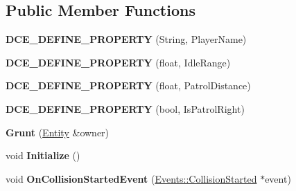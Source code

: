 \subsection*{Public Member Functions}
\begin{DoxyCompactItemize}
\item 
\hypertarget{classDCEngine_1_1Components_1_1Grunt_a0d5f3e19e82ab68d62b8fef4d9335e28}{{\bfseries D\-C\-E\-\_\-\-D\-E\-F\-I\-N\-E\-\_\-\-P\-R\-O\-P\-E\-R\-T\-Y} (String, Player\-Name)}\label{classDCEngine_1_1Components_1_1Grunt_a0d5f3e19e82ab68d62b8fef4d9335e28}

\item 
\hypertarget{classDCEngine_1_1Components_1_1Grunt_a43e84a3b4f21928fa86a934160e26d17}{{\bfseries D\-C\-E\-\_\-\-D\-E\-F\-I\-N\-E\-\_\-\-P\-R\-O\-P\-E\-R\-T\-Y} (float, Idle\-Range)}\label{classDCEngine_1_1Components_1_1Grunt_a43e84a3b4f21928fa86a934160e26d17}

\item 
\hypertarget{classDCEngine_1_1Components_1_1Grunt_ab9afd6d1611667b70f060617914939d5}{{\bfseries D\-C\-E\-\_\-\-D\-E\-F\-I\-N\-E\-\_\-\-P\-R\-O\-P\-E\-R\-T\-Y} (float, Patrol\-Distance)}\label{classDCEngine_1_1Components_1_1Grunt_ab9afd6d1611667b70f060617914939d5}

\item 
\hypertarget{classDCEngine_1_1Components_1_1Grunt_a40c60895b68ea313836fb03521e47877}{{\bfseries D\-C\-E\-\_\-\-D\-E\-F\-I\-N\-E\-\_\-\-P\-R\-O\-P\-E\-R\-T\-Y} (bool, Is\-Patrol\-Right)}\label{classDCEngine_1_1Components_1_1Grunt_a40c60895b68ea313836fb03521e47877}

\item 
\hypertarget{classDCEngine_1_1Components_1_1Grunt_a1f037fec617e2abcbb87ea484259f364}{{\bfseries Grunt} (\hyperlink{classDCEngine_1_1Entity}{Entity} \&owner)}\label{classDCEngine_1_1Components_1_1Grunt_a1f037fec617e2abcbb87ea484259f364}

\item 
\hypertarget{classDCEngine_1_1Components_1_1Grunt_a3d1d6a59ffd1534570b213b364dc57ad}{void {\bfseries Initialize} ()}\label{classDCEngine_1_1Components_1_1Grunt_a3d1d6a59ffd1534570b213b364dc57ad}

\item 
\hypertarget{classDCEngine_1_1Components_1_1Grunt_a3ccb4d1fc6f954f8169b0f96270824a6}{void {\bfseries On\-Collision\-Started\-Event} (\hyperlink{classDCEngine_1_1Events_1_1CollisionStarted}{Events\-::\-Collision\-Started} $\ast$event)}\label{classDCEngine_1_1Components_1_1Grunt_a3ccb4d1fc6f954f8169b0f96270824a6}


\end{DoxyCompactItemize}
